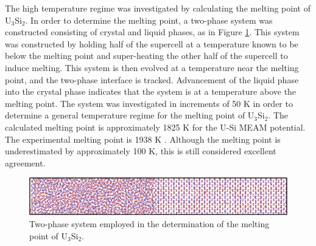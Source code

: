 \documentclass[review]{elsarticle}
\begin{document}
\FloatBarrier

The high temperature regime was investigated by calculating the melting point of U$_{3}$Si$_{2}$.  In order to determine the melting point, a two-phase system was constructed consisting of crystal and liquid phases, as in Figure \ref{fig:twophase}.  This system was constructed by holding half of the supercell at a temperature known to be below the melting point and super-heating the other half of the supercell to induce melting.  This system is then evolved at a temperature near the melting point, and the two-phase interface is tracked.  Advancement of the liquid phase into the crystal phase indicates that the system is at a temperature above the melting point.  The system was investigated in increments of 50 K in order to determine a general temperature regime for the melting point of U$_{3}$Si$_{2}$.  The calculated melting point is approximately 1825 K for the U-Si MEAM potential.  The experimental melting point is 1938 K \cite{berche2009}.  Although the melting point is underestimated by approximately 100 K, this is still considered excellent agreement.  

\begin{figure}[hbt]
	\centering
	\includegraphics[width=\textwidth]{two_phase2.png}
    \caption{Two-phase system employed in the determination of the melting point of U$_{3}$Si$_{2}$.}\label{fig:twophase}
\end{figure}

\FloatBarrier
\end{document}

